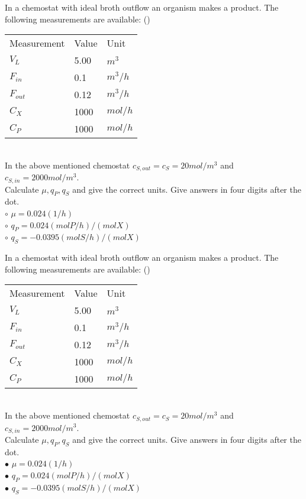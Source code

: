 \documentclass[]{beamer}
\begin{document}
\begin{frame}[shrink] {}
\addtocounter{questions}{1}
\color{blue}
In a chemostat with ideal broth outflow an organism makes a product. The following measurements are available: ()\\
\color{gray}
\begin{tabular}[ ]{l l l}
Measurement & Value & Unit \\
$V_L$ & 5.00 & $m^3$ \\
$F_{in}$ & 0.1 & $m^{3}/h$ \\
$F_{out}$ & 0.12 & $m^{3}/h$ \\
$C_{X}$ & 1000 & $mol/h$ \\
$C_{P}$ & 1000 & $mol/h$ \\
\end{tabular} \\
\color{black}
In the above mentioned chemostat $c_{S,out} = c_{S} =20mol/m^3$ and $c_{S,in} = 2000 mol/m^3$. \\[0.3em]
Calculate $\mu, q_P, q_S$ and give the correct units. Give answers in four digits after the dot. \\
\setlength{\parindent}{-0.4cm}
{\color{red}$\circ$} $\mu=0.024(1/h)$ \\
{\color{red}$\circ$} $q_P=0.024(molP/h)/(molX) $ \\
{\color{red}$\circ$} $q_S=-0.0395 (molS/h)/(molX)$ \\
\end{frame}
\begin{frame}[shrink] {}
\addtocounter{answers}{1}
\color{blue}
In a chemostat with ideal broth outflow an organism makes a product. The following measurements are available: ()\\
\color{gray}
\begin{tabular}[ ]{l l l}
Measurement & Value & Unit \\
$V_L$ & 5.00 & $m^3$ \\
$F_{in}$ & 0.1 & $m^{3}/h$ \\
$F_{out}$ & 0.12 & $m^{3}/h$ \\
$C_{X}$ & 1000 & $mol/h$ \\
$C_{P}$ & 1000 & $mol/h$ \\
\end{tabular} \\
\color{black}
In the above mentioned chemostat $c_{S,out} = c_{S} =20mol/m^3$ and $c_{S,in} = 2000 mol/m^3$. \\[0.3em]
Calculate $\mu, q_P, q_S$ and give the correct units. Give answers in four digits after the dot. \\
\setlength{\parindent}{-0.4cm}
{\color{red}$\bullet$} $\mu=0.024(1/h)$ \\
{\color{red}$\bullet$} $q_P=0.024(molP/h)/(molX) $ \\
{\color{red}$\bullet$} $q_S=-0.0395 (molS/h)/(molX)$ \\
\end{frame}
\end{document}
